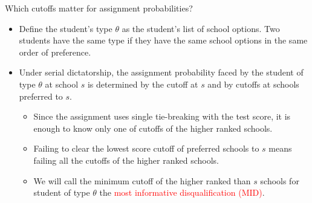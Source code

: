 \documentclass[notes,11pt, aspectratio=169]{beamer}
\begin{document}
\begin{frame}{Which cutoffs matter for assignment probabilities?}
  \begin{itemize}
  \vfill\item Define the student's type $\theta$ as the student's list of school options. Two students have the same type if they have the same school options in the same order of preference.
    \vfill\item Under serial dictatorship, the assignment probability faced by the student of type $\theta$ at school $s$ is determined by the cutoff at $s$ and by cutoffs at schools preferred to $s$.
      \begin{itemize}
    \vfill\item Since the assignment uses single tie-breaking with the test score, it is enough to know only one of cutoffs of the higher ranked schools.
    \vfill\item Failing to clear the lowest score cutoff of preferred schools to $s$ means failing all the cutoffs of the higher ranked schools.
    \vfill\item We will call the minimum cutoff of the higher ranked than $s$ schools for student of type $\theta$ the \textcolor{red}{most informative disqualification (MID)}.
     \end{itemize}
  \end{itemize}
\end{frame}
\end{document}
